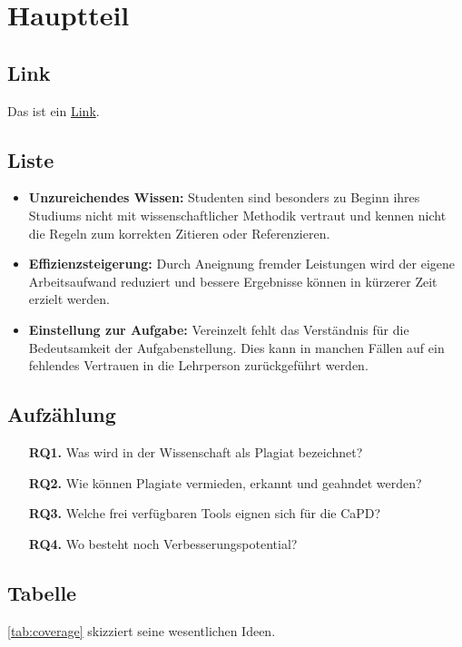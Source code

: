 \chapter{Hauptteil}

\section{Link}
Das ist ein \hyperref[ch:intro]{Link}.

\section{Liste}
\begin{itemize}
    \item \textbf{Unzureichendes Wissen:} Studenten sind besonders zu Beginn ihres Studiums nicht mit wissenschaftlicher Methodik vertraut und kennen \ggf{} nicht die Regeln zum korrekten Zitieren oder Referenzieren.
    \item \textbf{Effizienzsteigerung:} Durch Aneignung fremder Leistungen wird der eigene Arbeitsaufwand reduziert und bessere Ergebnisse können in kürzerer Zeit erzielt werden.
    \item \textbf{Einstellung zur Aufgabe:} Vereinzelt fehlt das Verständnis für die Bedeutsamkeit der Aufgabenstellung. Dies kann in manchen Fällen auf ein fehlendes Vertrauen in die Lehrperson zurückgeführt werden.
\end{itemize}

\section{Aufzählung}
\begin{enumerate}[align=left, leftmargin=3em]
    \item [{\bfseries RQ1.}] Was wird in der Wissenschaft als Plagiat bezeichnet?
    \item [{\bfseries RQ2.}] Wie können Plagiate vermieden, erkannt und geahndet werden?
    \item [{\bfseries RQ3.}] Welche frei verfügbaren Tools eignen sich für die CaPD?
    \item [{\bfseries RQ4.}] Wo besteht noch Verbesserungspotential?
\end{enumerate}

\section{Tabelle}
\cref{tab:coverage} skizziert seine wesentlichen Ideen.


